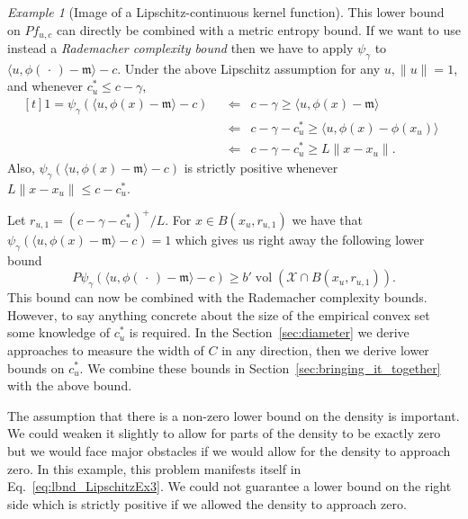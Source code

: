 \documentclass[10pt]{amsart}
\theoremstyle{definition}\newtheorem{defi}[theo]{Definition}\newtheorem{rema}[theo]{Remark}\newtheorem{exam}[theo]{Example}\newtheorem{exem}[theo]{Example}\newtheorem{nota}[theo]{Notation}
\theoremstyle{remark}
\newtheorem{examl}{Example}
\DeclareMathOperator{\vol}{vol}
\newcommand{\X}{\mathcal{X}}
\newcommand{\mean}{\mathfrak{m}}
\begin{document}
\begin{examl}[{Image of a Lipschitz-continuous kernel function}]
This lower bound on $P f_{u,c}$ can directly be combined with a metric entropy bound. If we want to use instead a \emph{Rademacher complexity bound} then we have to apply $\psi_\gamma$ to $\langle u, \phi(\,\cdot\,) - \mean\rangle -c$. Under the above Lipschitz assumption for any $u, \|u\|=1$, and whenever $c_u^* \leq c - \gamma$,
\begin{equation}\label{eq:psi_to_inner}
\begin{aligned}[t]
1 = \psi_\gamma(\langle u, \phi(x) - \mean \rangle -c)
\enspace &\Longleftarrow \enspace c-\gamma \geq \langle u, \phi(x) - \mean \rangle  \\
&\Longleftarrow \enspace c - \gamma - c_u^* \geq \langle u, \phi(x) - \phi(x_u) \rangle
\enspace\\\
&\Longleftarrow \enspace c - \gamma - c_u^* \geq L \|x - x_u\|.
\end{aligned}
\end{equation}
Also, $\psi_\gamma(\langle u, \phi(x) - \mean \rangle -c)$ is strictly positive whenever $L \|x - x_u\| \leq c - c_u^*$.


Let $r_{u,1} = (c - \gamma - c_u^*)^+/L$. For $x \in B(x_u,r_{u,1})$ we have that $\psi_\gamma(\langle u, \phi(x) - \mean \rangle -c) =1$ which gives us right away the following lower bound
\begin{equation}\label{eq:lbnd_LipschitzEx3}
P\psi_\gamma(\langle u, \phi(\,\cdot\,) - \mean \rangle - c) \geq b' \vol(\X \cap B(x_u,r_{u,1})).
\end{equation}
This bound can now be combined with the Rademacher complexity bounds. However, to say anything concrete about the size of the empirical convex set some knowledge of $c_u^*$ is required. In the Section~\ref{sec:diameter} we derive approaches to measure the width of $C$ in any direction, then we derive lower bounds on $c_u^*$. We combine these bounds in Section~\ref{sec:bringing_it_together} with the above bound.

The assumption that there is a non-zero lower bound on the density is important. We could weaken it slightly to allow for parts of the density to be exactly zero but we would face major obstacles if we would allow for the density to approach zero. In this example, this problem manifests itself in Eq.~\eqref{eq:lbnd_LipschitzEx3}. We could not guarantee a lower bound on the right side which is strictly positive if we allowed the density to approach zero.
\end{examl}
\end{document}
